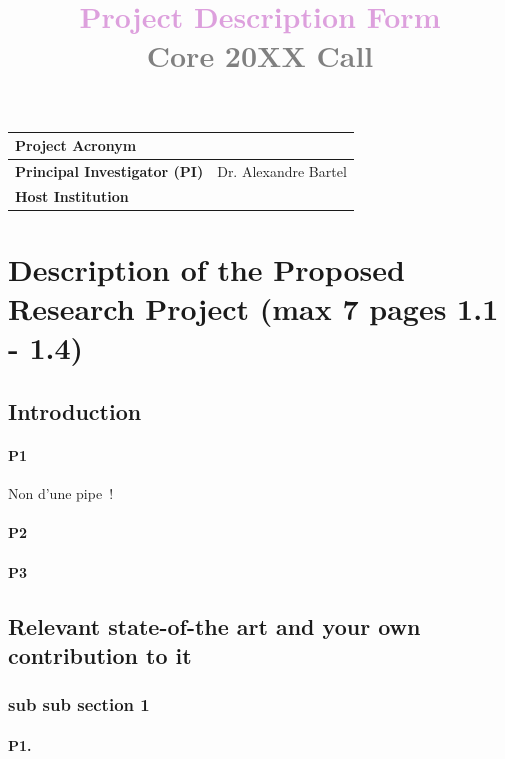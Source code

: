 \documentclass[a4paper, 11pt]{article}
\title{\bf \textcolor{Plum}{Project Description Form} \\ \textcolor{Gray}{Core 20XX Call}}
\author{\vspace{-5ex}}
\date{\vspace{-5ex}}
\begin{document}
\vspace{10cm}
\maketitle

\begin{center}
\begin{tabular}{|p{4.5cm}|p{}|}
\hline
\bf Project Acronym  &  \\ \hline
\bf Principal Investigator (PI)  &  Dr. Alexandre Bartel \\ \hline
\bf Host Institution  & \\ \hline
\end{tabular}
\end{center}

\newpage
\section{Description of the Proposed Research Project (max 7 pages 1.1 - 1.4)}\label{sec:description}
\subsection{Introduction}\label{sec:introduction}
\paragraph{P1}
\lipsum[1]
Non d'une pipe~\cite{bartel2012dexpler}!

\paragraph{P2}
\lipsum[2]

\paragraph{P3}
\lipsum[3]

\subsection{Relevant state-of-the art and your own contribution to it}\label{sec:stateoftheart}
\subsubsection{sub sub section 1}
\paragraph{P1.}
\lipsum[7]
\end{document}
